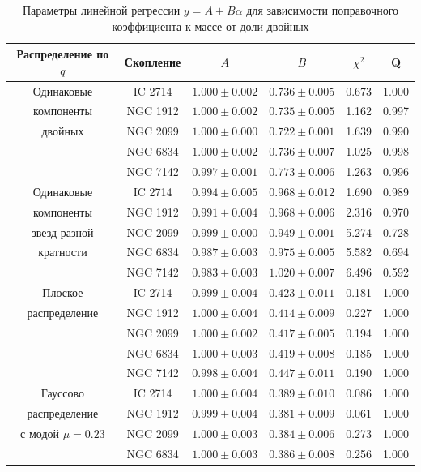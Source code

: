 \documentclass[a4paper,12pt]{article}
\begin{document}
\begin{table}[h!]
\caption{Параметры линейной регрессии $y = A + B\alpha$ для зависимости поправочного коэффициента к массе от доли двойных}
\vspace{0.5cm}
\centering
		\begin{tabular}{|c|c|c|c|c|c|}
			\hline
				{Распределение по $q$} & {Скопление}& ${A}$ & ${B}$ & ${\chi ^2}$ & {Q}\\
			\hline
				Одинаковые  &IC 2714&$1.000 \pm 0.002$&$0.736 \pm 0.005$&0.673&1.000\\
				компоненты &NGC 1912&$1.000 \pm 0.002$&$0.735 \pm 0.005$&1.162&0.997\\
				двойных&NGC 2099&$1.000 \pm 0.000$&$0.722 \pm 0.001$&1.639&0.990\\
					&NGC 6834&$1.000 \pm 0.002$&$0.736 \pm 0.007$&1.025&0.998\\
					&NGC 7142&$0.997 \pm 0.001$&$0.773 \pm 0.006$&1.263&0.996\\
			\hline
				Одинаковые  &IC 2714&$0.994 \pm 0.005$&$0.968 \pm 0.012$&1.690&0.989\\
				компоненты &NGC 1912&$0.991 \pm 0.004$&$0.968 \pm 0.006$&2.316&0.970\\
				звезд разной&NGC 2099&$0.999 \pm 0.000$&$0.949 \pm 0.001$&5.274&0.728\\
				кратности&NGC 6834&$0.987 \pm 0.003$&$0.975 \pm 0.005$&5.582&0.694\\
					&NGC 7142&$0.983 \pm 0.003$&$1.020 \pm 0.007$&6.496&0.592\\
			\hline
				Плоское &IC 2714&$0.999 \pm 0.004$&$0.423 \pm 0.011$&0.181&1.000\\
				распределение &NGC 1912&$1.000 \pm 0.004$&$0.414 \pm 0.009$&0.227&1.000\\
				&NGC 2099&$1.000 \pm 0.002$&$0.417 \pm 0.005$&0.194&1.000\\
					&NGC 6834&$1.000 \pm 0.003$&$0.419 \pm 0.008$&0.185&1.000\\
					&NGC 7142&$0.998 \pm 0.004$&$0.447 \pm 0.011$&0.190&1.000\\
			\hline
				Гауссово &IC 2714&$1.000 \pm 0.004$&$0.389 \pm 0.010$&0.086&1.000\\
				распределение &NGC 1912&$0.999 \pm 0.004$&$0.381 \pm 0.009$&0.061&1.000\\
				с модой $\mu = 0.23$&NGC 2099&$1.000 \pm 0.003$&$0.384 \pm 0.006$&0.273&1.000\\
					&NGC 6834&$1.000 \pm 0.003$&$0.386 \pm 0.008$&0.256&1.000\\

\end{tabular}
\end{table}
\end{document}
